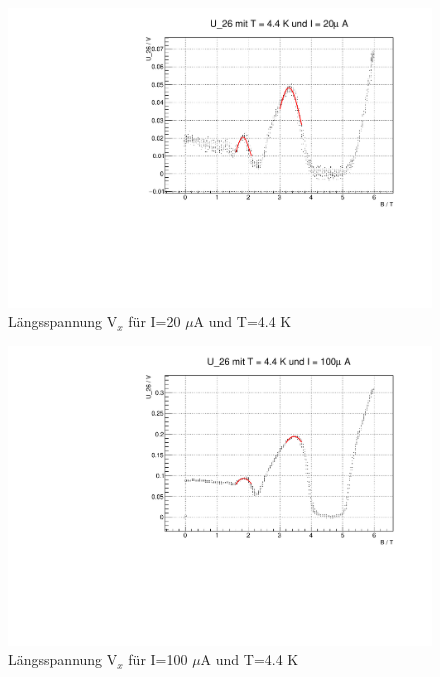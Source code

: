 \begin{figure}
\label{}
\centering
\includegraphics[scale = 0.5]{../plots/U_26_20muA_4400mK.pdf}
\caption{Längsspannung $\text{V}_x$ für I=20 $\mu$A und T=4.4 K}
\end{figure}

\begin{figure}
\label{}
\centering
\includegraphics[scale = 0.5]{../plots/U_26_100muA_4400mK.pdf}
\caption{Längsspannung $\text{V}_x$ für I=100 $\mu$A und T=4.4 K}
\end{figure}


